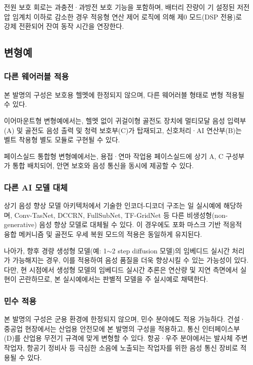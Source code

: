\documentclass{article}
\begin{document}
전원 보호 회로는 과충전·과방전 보호 기능을 포함하며, 배터리 잔량이 기 설정된 저전압 임계치 이하로 감소한 경우 적응형 연산 제어 로직에 의해 제0 모드(DSP 전용)로 강제 전환되어 잔여 동작 시간을 연장한다.

\subsection{변형예}

\subsubsection{다른 웨어러블 적용}

본 발명의 구성은 보호용 헬멧에 한정되지 않으며, 다른 웨어러블 형태로 변형 적용될 수 있다.

이어마운트형 변형예에서는, 헬멧 없이 귀걸이형 골전도 장치에 멀티모달 음성 입력부(A) 및 골전도 음성 출력 및 청력 보호부(C)가 탑재되고, 신호처리·AI 연산부(B)는 벨트 착용형 별도 모듈로 구현될 수 있다.

페이스실드 통합형 변형예에서는, 용접·연마 작업용 페이스실드에 상기 A, C 구성부가 통합 배치되어, 안면 보호와 음성 통신을 동시에 제공할 수 있다.

\subsubsection{다른 AI 모델 대체}

상기 음성 향상 모델 아키텍처에서 기술한 인코더-디코더 구조는 일 실시예에 해당하며, Conv-TasNet, DCCRN, FullSubNet, TF-GridNet 등 다른 비생성형(non-generative) 음성 향상 모델로 대체될 수 있다. 이 경우에도 포화 마스크 기반 적응적 융합 메커니즘 및 골전도 우세 복원 모드의 적용은 동일하게 유지된다.

나아가, 향후 경량 생성형 모델(예: 1$\sim$2 step diffusion 모델)의 임베디드 실시간 처리가 가능해지는 경우, 이를 적용하여 음성 품질을 더욱 향상시킬 수 있는 가능성이 있다. 다만, 현 시점에서 생성형 모델의 임베디드 실시간 추론은 연산량 및 지연 측면에서 실현이 곤란하므로, 본 실시예에서는 판별적 모델을 주 실시예로 채택한다.

\subsubsection{민수 적용}

본 발명의 구성은 군용 환경에 한정되지 않으며, 민수 분야에도 적용 가능하다. 건설·중공업 현장에서는 산업용 안전모에 본 발명의 구성을 적용하고, 통신 인터페이스부(D)를 산업용 무전기 규격에 맞게 변형할 수 있다. 항공·우주 분야에서는 발사체 주변 작업자, 항공기 정비사 등 극심한 소음에 노출되는 작업자를 위한 음성 통신 장비로 적용될 수 있다.
\end{document}
